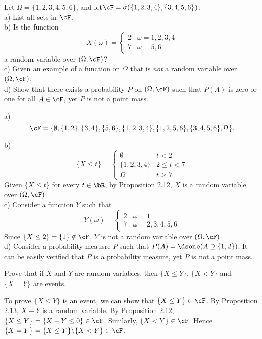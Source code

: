 \begin{exercise}
  Let $\Omega=\{1,2,3,4,5,6\}$, and let$\cF=\sigma(\{1,2,3,4\},\{3, 4, 5, 6\})$. \\
  a) List all sets in $\cF$. \\
  b) Is the function
    \[
      X(\omega) = \begin{cases}
        2 & \omega = 1, 2, 3, 4 \\
        7 & \omega = 5, 6
      \end{cases}
    \]
    a random variable over $(\Omega, \cF)$? \\
  c) Given an example of a function on $\Omega$ that is \textit{not} a random variable over $(\Omega, \cF)$. \\
  d) Show that there exists a probability $P$ on $(\Omega, \cF)$ such that $P(A)$ is zero or one for all $A\in\cF$, yet $P$ is not a point mass.
\end{exercise}
\begin{solution}
  a) \[ \cF = \{ \emptyset, \{1, 2\}, \{3, 4\}, \{5, 6\}, \{1, 2, 3, 4\}, \{1, 2, 5, 6\}, \{3, 4, 5, 6\}, \Omega \} .\]

  b) \[
       \{X\leq t\} = \begin{cases}
         \emptyset & t < 2 \\
         \{1, 2, 3, 4\} & 2 \leq t < 7 \\
         \Omega & t \geq 7
       \end{cases}
     \]
    Given $\{X\leq t\}$ for every $t\in\bR$, by Proposition 2.12, $X$ is a random variable over $(\Omega, \cF)$. \\

  c) Consider a function $Y$ such that
    \[
      Y(\omega) = \begin{cases}
        2 & \omega = 1 \\
        7 & \omega = 2, 3, 4, 5, 6
      \end{cases}
    \]
    Since $\{X\leq 2\} = \{1\}\notin\cF$, $Y$ is not a random variable over $(\Omega, \cF)$. \\

  d) Consider a probability meausre $P$ such that $P(A) = \dsone(A\supseteq\{1, 2\})$. It can be easily verified that $P$ is a probability measure, yet $P$ is not a point mass.

\end{solution}


\begin{exercise}
  Prove that if $X$ and $Y$ are random variables, then $\{X\leq Y\}$, $\{X<Y\}$ and $\{X=Y\}$ are events.
\end{exercise}
\begin{solution}
  To prove $\{X\leq Y\}$ is an event, we can show that $\{X\leq Y\}\in\cF$. By Proposition 2.13, $X-Y$ is a random variable. By Proposition 2.12, $\{X\leq Y\}=\{X-Y\leq 0\}\in\cF$. Similarly, $\{X<Y\}\in\cF$. Hence $\{X=Y\}=\{X\leq Y\}\backslash\{X<Y\}\in\cF$.
\end{solution}

